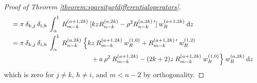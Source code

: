 \documentclass[11pt, oneside]{article}   	%
\begin{document}
\begin{proof}[Proof of Theorem \ref{theorem:sparsityofdifferentialoperators}]
\begin{align*}
	&\quad = \pi \: \delta_{k,j} \: \delta_{i,h} \: \int_\alpha^1 \: R_{m-k}^{(a+1,2k)} \: [k z R_{n-k}^{(a, 2k)} - \rho^2 R_{n-k}^{(a, 2k) \: \prime}] \: w_R^{(a+1, 2k)} \: {\rm d} z \\
	&\quad = \pi \: \delta_{k,j} \: \delta_{i,h} \: \int_\alpha^1 \: R_{n-k}^{(a, 2k)} \: \Big\{  k z \: R_{m-k}^{(a+1,2k)} \: w_R^{(1, 0)} + R_{m-k}^{(a+1,2k) \: \prime} \: w_R^{(1, 2)}\\
	&\quad \quad \quad \quad \quad \quad \quad \quad \quad \quad \quad \quad \quad + a \: \rho^2 \: R_{m-k}^{(a+1,2k)} - (2k+2) z \: R_{m-k}^{(a+1,2k)} \: w_R^{(1, 0)} \Big\} \: w_R^{(a, 2k)} \: {\rm d} z
\end{align*}
which is zero for $j \ne k$, $h \ne i$, and $m < n - 2$ by orthogonality.


\end{proof}
\end{document}
